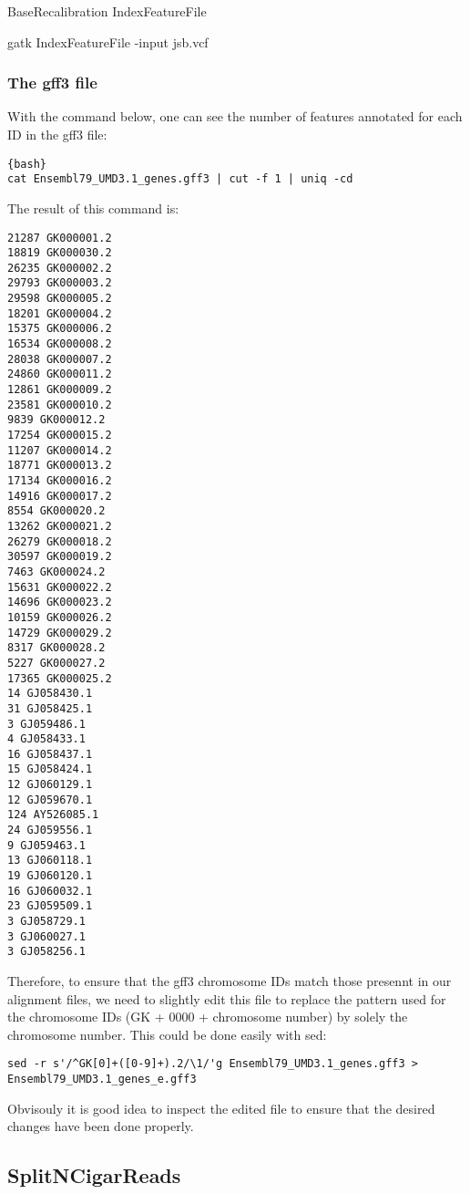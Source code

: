 BaseRecalibration
IndexFeatureFile

gatk IndexFeatureFile -input jsb.vcf


\subsubsection{The gff3 file}

With the command below, one can see the number of features annotated for each ID in the gff3 file: 

\begin{verbatim}{bash}
cat Ensembl79_UMD3.1_genes.gff3 | cut -f 1 | uniq -cd
\end{verbatim}


The result of this command is:
\begin{verbatim}
21287 GK000001.2
18819 GK000030.2
26235 GK000002.2
29793 GK000003.2
29598 GK000005.2
18201 GK000004.2
15375 GK000006.2
16534 GK000008.2
28038 GK000007.2
24860 GK000011.2
12861 GK000009.2
23581 GK000010.2
9839 GK000012.2
17254 GK000015.2
11207 GK000014.2
18771 GK000013.2
17134 GK000016.2
14916 GK000017.2
8554 GK000020.2
13262 GK000021.2
26279 GK000018.2
30597 GK000019.2
7463 GK000024.2
15631 GK000022.2
14696 GK000023.2
10159 GK000026.2
14729 GK000029.2
8317 GK000028.2
5227 GK000027.2
17365 GK000025.2
14 GJ058430.1
31 GJ058425.1
3 GJ059486.1
4 GJ058433.1
16 GJ058437.1
15 GJ058424.1
12 GJ060129.1
12 GJ059670.1
124 AY526085.1
24 GJ059556.1
9 GJ059463.1
13 GJ060118.1
19 GJ060120.1
16 GJ060032.1
23 GJ059509.1
3 GJ058729.1
3 GJ060027.1
3 GJ058256.1
\end{verbatim}

Therefore, to ensure that the gff3 chromosome IDs match those presennt in our alignment files, we need to slightly edit this file to replace the pattern used for the chromosome IDs (GK + 0000 + chromosome number) by solely the chromosome number. This could be done easily with sed:

\begin{verbatim}
sed -r s'/^GK[0]+([0-9]+).2/\1/'g Ensembl79_UMD3.1_genes.gff3 > Ensembl79_UMD3.1_genes_e.gff3
\end{verbatim}

Obvisouly it is good idea to inspect the edited file to ensure that the desired changes have been done properly.

\subsection{SplitNCigarReads}

